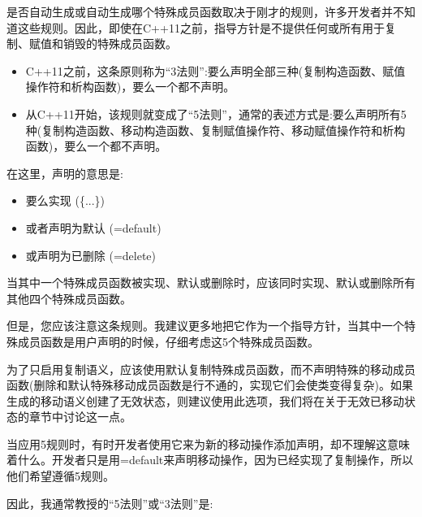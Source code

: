 是否自动生成或自动生成哪个特殊成员函数取决于刚才的规则，许多开发者并不知道这些规则。因此，即使在C++11之前，指导方针是不提供任何或所有用于复制、赋值和销毁的特殊成员函数。\par

\begin{itemize}
	\item C++11之前，这条原则称为“3法则”:要么声明全部三种(复制构造函数、赋值操作符和析构函数)，要么一个都不声明。
	\item 从C++11开始，该规则就变成了“5法则”，通常的表述方式是:要么声明所有5种(复制构造函数、移动构造函数、复制赋值操作符、移动赋值操作符和析构函数)，要么一个都不声明。
\end{itemize}

在这里，声明的意思是:\par

\begin{itemize}
	\item 要么实现 (\{...\})
	\item 或者声明为默认 (=default)
	\item 或声明为已删除 (=delete)
\end{itemize}

当其中一个特殊成员函数被实现、默认或删除时，应该同时实现、默认或删除所有其他四个特殊成员函数。\par

但是，您应该注意这条规则。我建议更多地把它作为一个指导方针，当其中一个特殊成员函数是用户声明的时候，仔细考虑这5个特殊成员函数。\par

为了只启用复制语义，应该使用默认复制特殊成员函数，而不声明特殊的移动成员函数(删除和默认特殊移动成员函数是行不通的，实现它们会使类变得复杂)。如果生成的移动语义创建了无效状态，则建议使用此选项，我们将在关于无效已移动状态的章节中讨论这一点。\par

当应用5规则时，有时开发者使用它来为新的移动操作添加声明，却不理解这意味着什么。开发者只是用=default来声明移动操作，因为已经实现了复制操作，所以他们希望遵循5规则。\par

因此，我通常教授的“5法则”或“3法则”是:\par

